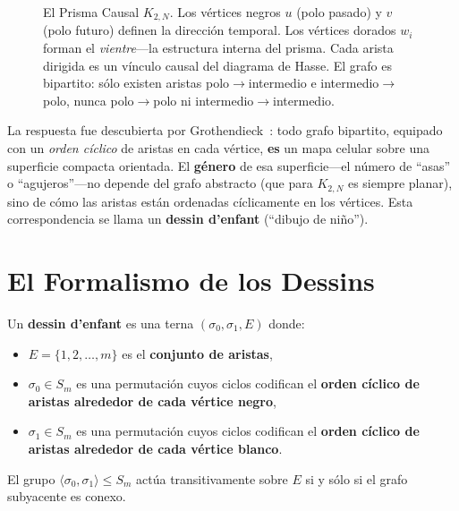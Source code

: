 \documentclass[11pt, a4paper, openany]{book}
\begin{document}
\begin{figure}[H]
\caption{El Prisma Causal $K_{2,N}$. Los vértices negros $u$ (polo
pasado) y $v$ (polo futuro) definen la dirección temporal. Los vértices
dorados $w_i$ forman el \emph{vientre}---la estructura interna del
prisma. Cada arista dirigida es un vínculo causal del diagrama de Hasse.
El grafo es bipartito: sólo existen aristas polo$\to$intermedio e
intermedio$\to$polo, nunca polo$\to$polo ni intermedio$\to$intermedio.}
\label{fig:prisma-base}
\end{figure}

La respuesta fue descubierta por Grothendieck~\cite{grothendieck1984}:
todo grafo bipartito, equipado con un \emph{orden cíclico} de aristas
en cada vértice, \textbf{es} un mapa celular sobre una superficie
compacta orientada. El \textbf{género} de esa superficie---el número de
``asas'' o ``agujeros''---no depende del grafo abstracto (que para
$K_{2,N}$ es siempre planar), sino de cómo las aristas están ordenadas
cíclicamente en los vértices. Esta correspondencia se llama un
\textbf{dessin d'enfant} (``dibujo de niño'').

\section{El Formalismo de los Dessins}
\label{sec:dessins-formalismo}

\begin{definition}
\label{def:dessin}
Un \textbf{dessin d'enfant} es una terna $(\sigma_0, \sigma_1, E)$
donde:
\begin{itemize}
  \item $E = \{1, 2, \ldots, m\}$ es el \textbf{conjunto de aristas},
  \item $\sigma_0 \in S_m$ es una permutación cuyos ciclos codifican el
        \textbf{orden cíclico de aristas alrededor de cada vértice negro},
  \item $\sigma_1 \in S_m$ es una permutación cuyos ciclos codifican el
        \textbf{orden cíclico de aristas alrededor de cada vértice blanco}.
\end{itemize}
El grupo $\langle \sigma_0, \sigma_1 \rangle \le S_m$ actúa
transitivamente sobre $E$ si y sólo si el grafo subyacente es conexo.
\end{definition}
\end{document}
